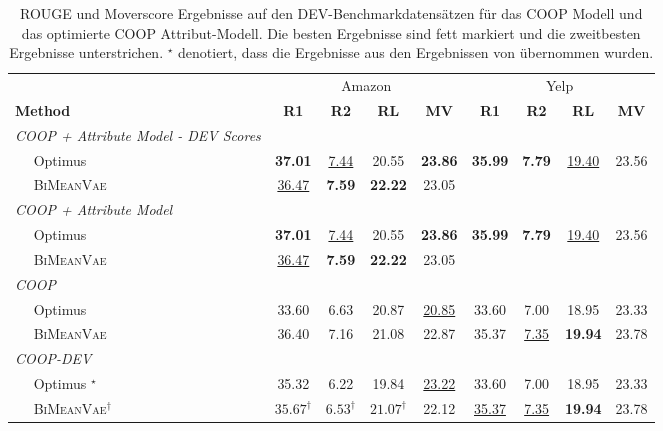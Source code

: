 \begin{table}[!h]
    \label{eval_results}
    \centering
    \begin{tabular}{@{}lcccccccc@{}}
    \toprule
                               & \multicolumn{4}{c}{Amazon} & \multicolumn{4}{c}{Yelp} \\ 
    \textbf{Method} & \textbf{R1} & \textbf{R2} & \textbf{RL} & \textbf{MV} & \textbf{R1} & \textbf{R2} & \textbf{RL} & \textbf{MV}\\ \midrule
    \textit{COOP + Attribute Model - DEV Scores}        &         &         &        &        &        &   & &     \\
    $\quad$ Optimus            &     \textbf{37.01}    &   \underline{7.44}  &  20.55  & \textbf{23.86} &   \textbf{35.99}   &   \textbf{7.79}       & \underline{19.40}   &   23.56 \\ 
    $\quad$ \textsc{BiMeanVae}   &   \underline{36.47}   &   \textbf{7.59}    &   \textbf{22.22}  & 23.05 &     &      &   &    \\ \midrule
    
    \textit{COOP + Attribute Model}        &         &         &        &        &        &   & &     \\
    $\quad$ Optimus            &     \textbf{37.01}    &   \underline{7.44}  &  20.55  & \textbf{23.86} &   \textbf{35.99}   &   \textbf{7.79}       & \underline{19.40}   &   23.56 \\ 
    $\quad$ \textsc{BiMeanVae}   &   \underline{36.47}   &   \textbf{7.59}    &   \textbf{22.22}  & 23.05 &     &      &   &    \\ \midrule
    

    \textit{COOP}              &         &         &        &        &        & &   &    \\
    $\quad$ Optimus           & 33.60  & 6.63    & 20.87 & \underline{20.85} & 33.60  & 7.00   & 18.95 & 23.33\\ 
    $\quad$ \textsc{BiMeanVae}  & 36.40 &  7.16 &  21.08 & 22.87 & 35.37  & \underline{7.35}  & \textbf{19.94} & 23.78\\ \midrule
    
    \textit{COOP-DEV}              &         &         &        &        &        & &   &    \\
    $\quad$ Optimus $^{\star}$           & 35.32   & 6.22    & 19.84 & \underline{23.22} & 33.60  & 7.00   & 18.95 & 23.33\\ 
    $\quad$ \textsc{BiMeanVae}$^{\dagger}$  & $\text{35.67}^{\dagger}$    & $\text{6.53}^{\dagger}$   & \underline{$\text{21.07}^{\dagger}$} & 22.12 & \underline{35.37}  & \underline{7.35}  & \textbf{19.94} & 23.78\\ \bottomrule
    \end{tabular}
    \caption{ROUGE und Moverscore Ergebnisse auf den DEV-Benchmarkdatensätzen für das COOP Modell und das optimierte COOP Attribut-Modell. Die besten Ergebnisse sind fett markiert und die zweitbesten Ergebnisse unterstrichen.
    $^{\star}$ denotiert, dass die Ergebnisse aus den Ergebnissen von \citep{coop} übernommen wurden.
    }
\end{table}

\pagebreak
